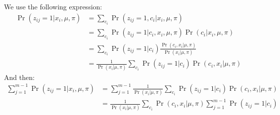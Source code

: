 \begin{enumerate}
{    We use the following expression:
    \begin{align}
        \Pr(z_{ij}=1|x_i, \mu, \pi) &= \sum_{c_i} \Pr(z_{ij}=1, c_i|x_i, \mu, \pi) \\
        &= \sum_{c_i} \Pr(z_{ij}=1|c_i, x_i, \mu, \pi)\Pr(c_i|x_i, \mu, \pi) \\
        &= \sum_{c_i} \Pr(z_{ij}=1|c_i) \frac{\Pr(c_i, x_i|\mu, \pi)}{\Pr(x_i|\mu, \pi)} \\
        &= \frac{1}{\Pr(x_i|\mu, \pi)} \sum_{c_i} \Pr(z_{ij}=1|c_i) \Pr(c_i, x_i|\mu, \pi) 
    \end{align}
    And then:
    \begin{align}
        \sum_{j=1}^{m-1} \Pr(z_{ij}=1|x_i, \mu, \pi) &= \sum_{j=1}^{m-1} \frac{1}{\Pr(x_i|\mu, \pi)}  \sum_{c_i} \Pr(z_{ij}=1|c_i) \Pr(c_i, x_i|\mu, \pi) \\
        &= \frac{1}{\Pr(x_i|\mu, \pi)} \sum_{c_i} \Pr(c_i, x_i|\mu, \pi)  \sum_{j=1}^{m-1} \Pr(z_{ij}=1|c_i)
    \end{align}
    }

\end{enumerate}

